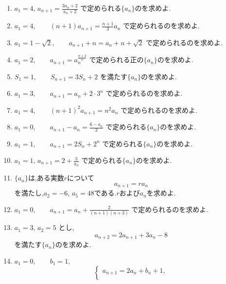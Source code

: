 \begin{enumerate}[label=\textbf{問\arabic*.},leftmargin=3.8em,format=\bookitemlink{practice-basic}{problem}{hint}]
  \item $a_1=4,\,a_{n+1}=\frac{3a_n+2}{a_n+2}$
    で定められる$\{a_n\}$のを求めよ.
  \item $a_1=4,\qquad (n+1)a_{n+1}=\frac{n+1}{3}a_n$
    で定められるのを求めよ.
  \item $a_1=1-\sqrt2,\qquad a_{n+1}+n=a_n+n+\sqrt2$
    で定められるのを求めよ.
  \item $a_1=2,\qquad a_{n+1}=a_n^{\frac{n+2}{n}}$
    で定められる正の$\{a_n\}$のを求めよ.
  \item $S_1=1,\qquad S_{n+1}=3S_n+2$
    を満たす$\{a_n\}$のを求めよ.
  \item $a_1=3,\qquad a_{n+1}=a_n+2\cdot3^n$
    で定められるのを求めよ.
  \item $a_1=4,\qquad (n+1)^2a_{n+1}=n^2a_n$
    で定められるのを求めよ.
  \item $a_1=0,\qquad a_{n+1}-a_n=\frac{6-a_n}{3}$
    で定められる$\{a_n\}$のを求めよ.
  \item $a_1=1,\qquad a_{n+1}=2S_n+2^n$
    で定められる$\{a_n\}$のを求めよ.
  \item $a_1=1,\,a_{n+1}=2+\frac3{a_n}$
    で定められる$\{a_n\}$のを求めよ.
  \item {}$\{a_n\}$は,ある実数$r$について
    \[
      a_{n+1}=ra_n
    \]
    を満たし,$a_2=-6$, $a_5=48$である.$r$および$a_n$を求めよ.
  \item $a_1=0,\qquad a_{n+1}=a_n+\frac{2}{(n+1)(n+3)}$
    で定められるのを求めよ.
  \item $a_1=3,\,a_2=5$ とし,
    \[
      a_{n+2}=2a_{n+1}+3a_n-8
    \]
    を満たす$\{a_n\}$のを求めよ.
  \item $a_1=0,\qquad b_1=1,$
    \[
      \begin{cases}
        a_{n+1}=2a_n+b_n+1,\\

\end{cases}\]
\end{enumerate}
